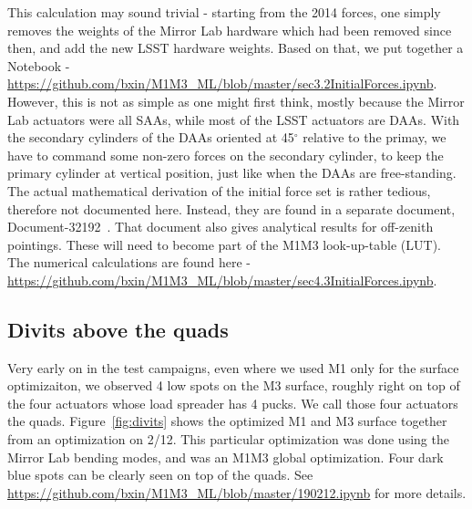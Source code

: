 \documentclass [twoside,openbib,12pt]{article}
\begin{document}
This calculation may sound trivial - starting from the 2014 forces,
one simply removes the weights of the Mirror Lab hardware which had been removed
since then, and add the new LSST hardware weights.
Based on that, we put together a Notebook - \url{https://github.com/bxin/M1M3_ML/blob/master/sec3.2InitialForces.ipynb}.
However, this is not as simple as one might first think, mostly
because the Mirror Lab actuators were all SAAs, while most of the LSST
actuators are DAAs. With the secondary cylinders of the DAAs oriented at
45$^\circ$ relative to the primay, we have to command some non-zero
forces on the secondary cylinder, to keep the primary cylinder at
vertical position, just like when the DAAs are free-standing.
The actual mathematical derivation of the initial force set is rather tedious,
therefore not documented here. Instead, they are found in a separate
document, 
Document-32192~\cite{m1m3initF}.
That document also gives analytical results for off-zenith
pointings. These will need to become part of the M1M3 look-up-table (LUT).
The numerical calculations are found here - \url{https://github.com/bxin/M1M3_ML/blob/master/sec4.3InitialForces.ipynb}.


\subsection{Divits above the quads}
\label{sec:divits}

Very early on in the test campaigns, even where we used M1 only for
the surface optimizaiton, we observed 4 low spots on the M3
surface, roughly right on top of the four actuators whose load
spreader has 4 pucks. We call those four actuators the quads.
Figure~\ref{fig:divits} shows the optimized M1 and M3 surface together from
an optimization on 2/12. This particular optimization was done using
the Mirror Lab bending modes, and was an M1M3 global
optimization. Four dark blue spots can be clearly seen on top of the quads.
See \url{https://github.com/bxin/M1M3_ML/blob/master/190212.ipynb} for
more details.
  
\end{document}
